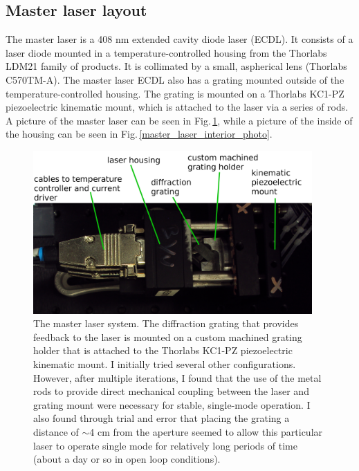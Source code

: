 \subsection{Master laser layout}
The master laser is a 408 nm extended cavity diode laser (ECDL). It consists of a laser diode mounted in a temperature-controlled housing from the Thorlabs LDM21 family of products. It is collimated by a small, aspherical lens (Thorlabs C570TM-A). The master laser ECDL also has a grating mounted outside of the temperature-controlled housing. The grating is mounted on a Thorlabs KC1-PZ piezoelectric kinematic mount, which is attached to the laser via a series of rods. A picture of the master laser can be seen in Fig.\,\ref{master_laser_photo}, while a picture of the inside of the housing can be seen in Fig.\,\ref{master_laser_interior_photo}.

\begin{figure}
\centerline{
\includegraphics[width=0.95\textwidth]{master_laser.JPG}}
\caption[Photograph of master laser]{\label{master_laser_photo} The master laser system. The diffraction grating that provides feedback to the laser is mounted on a custom machined grating holder that is attached to the Thorlabs KC1-PZ piezoelectric kinematic mount. I initially tried several other configurations. However, after multiple iterations, I found that the use of the metal rods to provide direct  mechanical coupling between the laser and grating mount were necessary for stable, single-mode operation. I also found through trial and error that placing the grating a distance of $\sim$4 cm from the aperture seemed to allow this particular laser to operate single mode for relatively long periods of time (about a day or so in open loop conditions).}
\end{figure}


